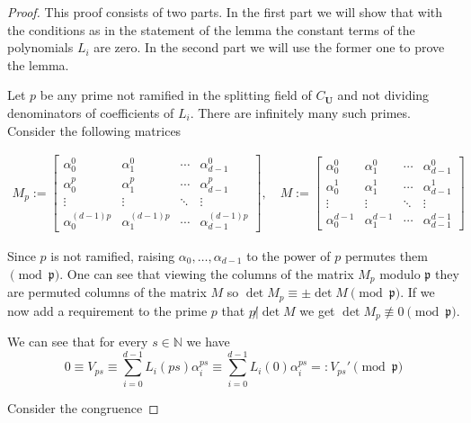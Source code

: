 \documentclass[preprint,12pt]{elsarticle}
\newcommand{\N}{\mathbb{N}}
\newcommand{\alphas}{\alpha_0,\ldots,\alpha_{d-1}}
\newcommand{\pp}{\mathfrak{p} }
\begin{document}
\begin{proof}
    This proof consists of two parts. In the first part we will show that with the conditions as in the statement of the lemma the constant terms of  the polynomials $L_i$ are zero. In the second part we will use the former one to prove the lemma.

    
    Let $p$ be any prime not ramified in the splitting field of $C_{\mathbf{U}}$ and not dividing denominators of coefficients of $L_i$. There are infinitely many such primes.
    Consider the following matrices

    \begin{align}
        M_p :=
        \begin{bmatrix}
            \alpha_0^{0} & \alpha_1^{0} & \cdots & \alpha_{d-1}^{0}\\
            \alpha_0^{p} & \alpha_1^{p} & \cdots & \alpha_{d-1}^{p}\\
            \vdots & \vdots & \ddots & \vdots \\
            \alpha_0^{(d-1)p} & \alpha_1^{(d-1)p} & \cdots & \alpha_{d-1}^{(d-1)p}
        \end{bmatrix}
        ,\quad
        M :=
        \begin{bmatrix}
            \alpha_0^{0} & \alpha_1^{0} & \cdots & \alpha_{d-1}^{0}\\
            \alpha_0^{1} & \alpha_1^{1} & \cdots & \alpha_{d-1}^{1}\\
            \vdots & \vdots & \ddots & \vdots \\
            \alpha_0^{d-1} & \alpha_1^{d-1} & \cdots & \alpha_{d-1}^{d-1}
        \end{bmatrix}
    \end{align}

    
    Since $p$ is not ramified, raising $\alphas$ to the power of $p$ permutes them $\pmod\pp$. One can see that viewing the columns of the matrix $M_p$ modulo $\pp$ they are permuted columns of the matrix $M$ so $\det M_p \equiv \pm\det M \pmod \pp$. If we now add a requirement to the prime $p$ that $p\not|\det M$ we get $\det M_p \not\equiv 0 \pmod \pp$.

    We can see that for every $s\in \N$ we have
    $$
        0 \equiv
        {V}_{ps} \equiv 
        \sum_{i=0}^{d-1}L_i(ps)\alpha_i^{ps} \equiv 
        \sum_{i=0}^{d-1}L_i(0)\alpha_i^{ps} =: {V}_{ps}'
        \pmod{\pp}
    $$

    
    Consider the congruence
    

\end{proof}
\end{document}
